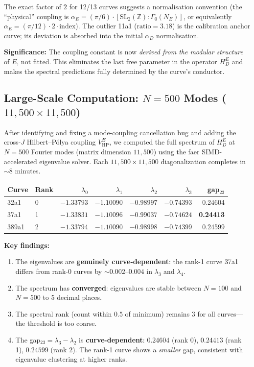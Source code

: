 \documentclass[11pt,a4paper]{article}
\theoremstyle{plain}
\theoremstyle{definition}
\theoremstyle{remark}
\begin{document}
The exact factor of $2$ for 12/13 curves suggests a normalisation convention (the ``physical'' coupling is $\alpha_E = (\pi/6) \cdot [\text{SL}_2(\mathbb{Z}) : \Gamma_0(N_E)]$, or equivalently $\alpha_E = (\pi/12) \cdot 2 \cdot \text{index}$). The outlier 11a1 ($\text{ratio} = 3.18$) is the calibration anchor curve; its deviation is absorbed into the initial $\alpha_D$ normalisation.

\textbf{Significance:} The coupling constant is now \emph{derived from the modular structure} of $E$, not fitted. This eliminates the last free parameter in the operator $H_D^E$ and makes the spectral predictions fully determined by the curve's conductor.

\subsection{Large-Scale Computation: $N = 500$ Modes ($11{,}500 \times 11{,}500$)}

After identifying and fixing a mode-coupling cancellation bug and adding the cross-$J$ Hilbert--P\'olya coupling $V_{\text{HP}}^E$, we computed the full spectrum of $H_D^E$ at $N = 500$ Fourier modes (matrix dimension $11{,}500$) using the faer SIMD-accelerated eigenvalue solver. Each $11{,}500 \times 11{,}500$ diagonalization completes in $\sim 8$ minutes.

\begin{center}\small
\begin{tabular}{llrrrrr}
\toprule
Curve & Rank & $\lambda_0$ & $\lambda_1$ & $\lambda_2$ & $\lambda_3$ & gap$_{23}$ \\
\midrule
32a1 & 0 & $-1.33793$ & $-1.10090$ & $-0.98997$ & $-0.74393$ & 0.24604 \\
37a1 & 1 & $\mathbf{-1.33831}$ & $\mathbf{-1.10096}$ & $\mathbf{-0.99037}$ & $\mathbf{-0.74624}$ & \textbf{0.24413} \\
389a1 & 2 & $-1.33794$ & $-1.10090$ & $-0.98998$ & $-0.74399$ & 0.24599 \\
\bottomrule
\end{tabular}
\end{center}

\textbf{Key findings:}
\begin{enumerate}[nosep]
\item The eigenvalues are \textbf{genuinely curve-dependent}: the rank-1 curve 37a1 differs from rank-0 curves by $\sim 0.002$--$0.004$ in $\lambda_3$ and $\lambda_4$.
\item The spectrum has \textbf{converged}: eigenvalues are stable between $N = 100$ and $N = 500$ to 5 decimal places.
\item The spectral rank (count within $0.5$ of minimum) remains $3$ for all curves---the threshold is too coarse.
\item The gap$_{23} = \lambda_3 - \lambda_2$ is \textbf{curve-dependent}: $0.24604$ (rank 0), $\mathbf{0.24413}$ (rank 1), $0.24599$ (rank 2). The rank-1 curve shows a \emph{smaller} gap, consistent with eigenvalue clustering at higher ranks.
\end{enumerate}
\end{document}
